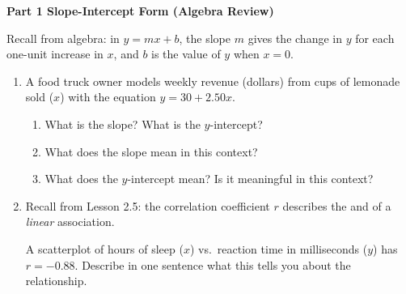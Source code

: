 \documentclass[10pt]{article}
\begin{document}
\namedateperiod

\vspace{0.3in}

{\large\bfseries\color{navy} Part 1 \quad Slope-Intercept Form (Algebra Review)}

\vspace{0.12in}
\noindent Recall from algebra: in $y = mx + b$, the slope $m$ gives the change in $y$ for
each one-unit increase in $x$, and $b$ is the value of $y$ when $x = 0$.

\vspace{0.1in}

\begin{enumerate}[leftmargin=1.6em, itemsep=0.22in]

  \item A food truck owner models weekly revenue (dollars) from cups of lemonade sold ($x$) with
        the equation $y = 30 + 2.50x$.

        \begin{enumerate}[label=\textbf{(\alph*)}, leftmargin=1.6em, itemsep=8pt]
          \item What is the slope?  \quad What is the $y$-intercept? 

          \item What does the slope mean in this context?\\[8pt]

          \item What does the $y$-intercept mean? Is it meaningful in this context?\\[8pt]
        \end{enumerate}

  \item Recall from Lesson 2.5: the correlation coefficient $r$ describes the
         and  of a \textit{linear} association.

        \vspace{8pt}
        A scatterplot of hours of sleep ($x$) vs.\ reaction time in milliseconds ($y$) has
        $r = -0.88$. Describe in one sentence what this tells you about the relationship.\\[8pt]

\end{enumerate}
\end{document}
